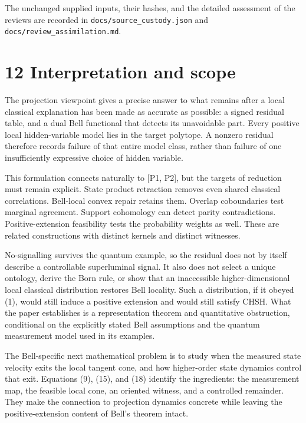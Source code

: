 \documentclass[
]{article}
\begin{document}
The unchanged supplied inputs, their hashes, and the detailed assessment of the reviews are recorded in \texttt{docs/source\_custody.json} and \texttt{docs/review\_assimilation.md}.

\section{12 Interpretation and scope}\label{interpretation-and-scope}

The projection viewpoint gives a precise answer to what remains after a local classical explanation has been made as accurate as possible: a signed residual table, and a dual Bell functional that detects its unavoidable part. Every positive local hidden-variable model lies in the target polytope. A nonzero residual therefore records failure of that entire model class, rather than failure of one insufficiently expressive choice of hidden variable.

This formulation connects naturally to {[}P1, P2{]}, but the targets of reduction must remain explicit. State product retraction removes even shared classical correlations. Bell-local convex repair retains them. Overlap coboundaries test marginal agreement. Support cohomology can detect parity contradictions. Positive-extension feasibility tests the probability weights as well. These are related constructions with distinct kernels and distinct witnesses.

No-signalling survives the quantum example, so the residual does not by itself describe a controllable superluminal signal. It also does not select a unique ontology, derive the Born rule, or show that an inaccessible higher-dimensional local classical distribution restores Bell locality. Such a distribution, if it obeyed (1), would still induce a positive extension and would still satisfy CHSH. What the paper establishes is a representation theorem and quantitative obstruction, conditional on the explicitly stated Bell assumptions and the quantum measurement model used in its examples.

The Bell-specific next mathematical problem is to study when the measured state velocity exits the local tangent cone, and how higher-order state dynamics control that exit. Equations (9), (15), and (18) identify the ingredients: the measurement map, the feasible local cone, an oriented witness, and a controlled remainder. They make the connection to projection dynamics concrete while leaving the positive-extension content of Bell's theorem intact.
\end{document}
